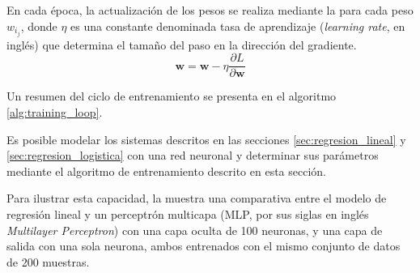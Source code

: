 
En cada época, la actualización de los pesos se realiza mediante la  para cada peso $w_{i_j}$, donde $\eta$ es una constante denominada tasa de aprendizaje (\textit{learning rate}, en inglés) que determina el tamaño del paso en la dirección del gradiente.
\begin{equation}
    \label{eq:sgd}
    \mathbf{w} = \mathbf{w} - \eta \frac{\partial L}{\partial \mathbf{w}}
\end{equation}

Un resumen del ciclo de entrenamiento se presenta en el algoritmo \ref{alg:training_loop}.

\begin{algorithm}[H]
    \caption[Ciclo de entrenamiento]{Ciclo de entrenamiento.}
  \label{alg:training_loop}
  \BlankLine
\end{algorithm}

Es posible modelar los sistemas descritos en las secciones \ref{sec:regresion_lineal} y \ref{sec:regresion_logistica} con una red neuronal y determinar sus parámetros mediante el algoritmo de entrenamiento descrito en esta sección.

Para ilustrar esta capacidad, la  muestra una comparativa entre el modelo de regresión lineal y un perceptrón multicapa (MLP, por sus siglas en inglés \textit{Multilayer Perceptron}) con una capa oculta de 100 neuronas, y una capa de salida con una sola neurona, ambos entrenados con el mismo conjunto de datos de 200 muestras.

